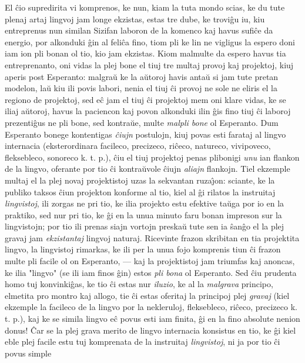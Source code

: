    El \^cio supredirita vi komprenos, ke nun, kiam la tuta mondo scias,
ke du tute plenaj artaj lingvoj jam longe ekzistas, estas tre dube,
ke trovi\^gu iu, kiu entreprenus nun similan Sizifan laboron de la
komenco kaj havus sufi\^ce da energio, por alkonduki \^gin al
feli\^ca fino, tiom pli ke lin ne vigligus la espero doni iam ion
pli bonan ol tio, kio jam ekzistas. Kiom malmulte da espero havus
tia entreprenanto, oni vidas la plej bone el tiuj tre multaj provoj
kaj projektoj, kiuj aperis post Esperanto: malgra\u u ke la a\u
utoroj havis anta\u u si jam tute pretan modelon, la\u u kiu ili
povis labori, nenia el tiuj \^ci provoj ne sole ne eliris el la
regiono de projektoj, sed e\^c jam el tiuj \^ci projektoj mem oni
klare vidas, ke se iliaj a\u utoroj, havus la paciencon kaj povon
alkonduki ilin \^gis fino tiuj \^ci laboroj prezenti\^gus ne pli
bone, sed kontra\u ue, multe {\sl malpli bone} ol Esperanto. Dum
Esperanto bonege kontentigas {\sl \^ciujn} postulojn, kiuj povas
esti farataj al lingvo internacia (eksterordinara facileco,
precizeco, ri\^ceco, natureco, vivipoveco, fleksebleco, sonoreco k.
t. p.), \^ciu el tiuj projektoj penas plibonigi {\sl unu} ian
flankon de la lingvo, oferante por tio \^ci kontra\u uvole \^ciujn
{\sl aliajn} flankojn. Tiel ekzemple multaj el la plej novaj
projektistoj uzas la sekvantan ruza\^{\j}on: sciante, ke la publiko
taksos \^ciun projekton konforme al tio, kiel al \^gi rilatos la
instruitaj {\sl lingvistoj}, ili zorgas ne pri tio, ke ilia projekto
estu efektive ta\u uga por io en la praktiko, sed nur pri tio, ke
\^gi en la unua minuto faru bonan impreson sur la lingvistojn; por
tio ili prenas siajn vortojn preska\u u tute sen ia \^san\^go el la
plej gravaj jam {\sl ekzistantaj} lingvoj naturaj. Ricevinte frazon
skribitan en tia projektita lingvo, la lingvistoj rimarkas, ke ili
per la unua fojo komprenis tiun \^ci frazon multe pli facile ol on
Esperanto, --- kaj la projektistoj jam triumfas kaj anoncas, ke ilia
"lingvo" (se ili iam finos \^gin) estos {\sl pli bona} ol
Esperanto. Sed \^ciu prudenta homo tuj konvinki\^gas, ke tio \^ci
estas nur {\sl iluzio}, ke al la {\sl malgrava} principo, elmetita
pro montro kaj allogo, tie \^ci estas oferitaj la principoj plej
{\sl gravaj} (kiel ekzemple la facileco de la lingvo por la
nekleruloj, fleksebleco, ri\^ceco, precizeco k. t. p.), kaj ke se
simila lingvo e\^c povus esti iam finita, \^gi en la fino absolute
nenion donus! \^Car se la plej grava merito de lingvo internacia
konsistus en tio, ke \^gi kiel eble plej facile estu tuj komprenata
de la instruitaj {\sl lingvistoj}, ni ja por tio \^ci povus simple
